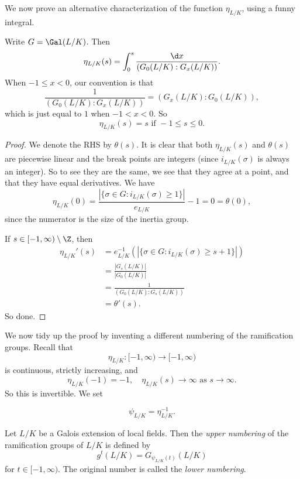 \documentclass[a4paper]{article}
\begin{document}
We now prove an alternative characterization of the function $\eta_{L/K}$, using a funny integral.
\begin{prop}
  Write $G = \Gal(L/K)$. Then
  \[
    \eta_{L/K}(s) = \int_0^s \frac{\d x}{(G_0(L/K): G_x(L/K))}.
  \]
  When $-1 \leq x < 0$, our convention is that
  \[
    \frac{1}{(G_0(L/K):G_x(L/K))} = (G_x(L/K): G_0(L/K)),
  \]
  which is just equal to $1$ when $-1 < x < 0$. So
  \[
    \eta_{L/K}(s) = s\text{ if }-1 \leq s \leq 0.
  \]
\end{prop}

\begin{proof}
  We denote the RHS by $\theta(s)$. It is clear that both $\eta_{L/K}(s)$ and $\theta(s)$ are piecewise linear and the break points are integers (since $i_{L/K}(\sigma)$ is always an integer). So to see they are the same, we see that they agree at a point, and that they have equal derivatives. We have
  \[
    \eta_{L/K}(0) = \frac{|\{\sigma \in G: i_{L/K}(\sigma) \geq 1\}|}{e_{L/K}} - 1 = 0 = \theta(0),
  \]
  since the numerator is the size of the inertia group.

  If $s \in [-1, \infty) \setminus \Z$, then
  \begin{align*}
    \eta_{L/K}'(s) &= e_{L/K}^{-1} (|\{\sigma \in G: i_{L/K}(\sigma) \geq s + 1\}|) \\
    &= \frac{|G_s(L/K)|}{|G_0(L/K)|} \\
    &= \frac{1}{(G_0(L/K):G_s(L/K))} \\
    &= \theta'(s).
  \end{align*}
  So done.
\end{proof}


We now tidy up the proof by inventing a different numbering of the ramification groups. Recall that
\[
  \eta_{L/K}: [-1, \infty) \to [-1, \infty)
\]
is continuous, strictly increasing, and
\[
  \eta_{L/K}(-1) = -1,\quad \eta_{L/K}(s) \to \infty\text{ as } s \to \infty.
\]
So this is invertible. We set
\begin{notation}
  \[
    \psi_{L/K} = \eta_{L/K}^{-1}.
  \]
\end{notation}

\begin{defi}
  Let $L/K$ be a Galois extension of local fields. Then the \emph{upper numbering} of the ramification groups of $L/K$ is defined by
  \[
    g^t(L/K) = G_{\psi_{L/K}(t)} (L/K)
  \]
  for $t \in [-1, \infty)$. The original number is called the \emph{lower numbering}.
\end{defi}
\end{document}
